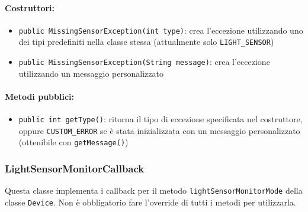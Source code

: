 \paragraph{Costruttori:}\begin{itemize}
	\item \texttt{public MissingSensorException(int type)}: crea l'eccezione utilizzando uno dei tipi predefiniti nella classe stessa (attualmente solo \texttt{LIGHT\_SENSOR})
	\item \texttt{public MissingSensorException(String message)}: crea l'eccezione utilizzando un messaggio personalizzato
\end{itemize}

\paragraph{Metodi pubblici:}\begin{itemize}
	\item \texttt{public int getType()}: ritorna il tipo di eccezione specificata nel costruttore, oppure \texttt{CUSTOM\_ERROR} se è stata inizializzata con un messaggio personalizzato (ottenibile con \texttt{getMessage()})
\end{itemize}

\subsubsection{LightSensorMonitorCallback}
Questa classe implementa i callback per il metodo \texttt{lightSensorMonitorMode} della classe \texttt{Device}. Non è obbligatorio fare l'override di tutti i metodi per utilizzarla.


